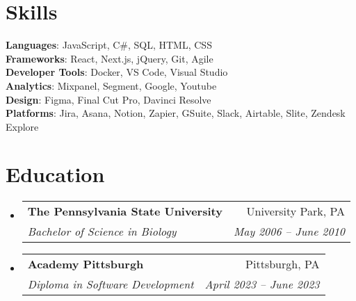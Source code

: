 \documentclass[letterpaper,11pt]{article}
\makeatletter
\newcommand{\resumeSubheading}[4]{
  \vspace{-2pt}\item
    \begin{tabular*}{0.97\textwidth}[t]{l@{\extracolsep{\fill}}r}
      \textbf{#1} & #2 \\
      \textit{\small#3} & \textit{\small #4} \\
    \end{tabular*}\vspace{-7pt}
}
\newcommand{\resumeSubHeadingListStart}{\begin{itemize}[leftmargin=0.15in, label={}]}
\newcommand{\resumeSubHeadingListEnd}{\end{itemize}}
\makeatother
\begin{document}
\section{Skills}
\begin{itemize}[leftmargin=0.15in, label={}]
    \small{
      \item{
      \textbf{Languages}{: JavaScript, C\#, SQL, HTML, CSS} \\
      \textbf{Frameworks}{: React, Next.js, jQuery, Git, Agile} \\
      \textbf{Developer Tools}{: Docker, VS Code, Visual Studio} \\
      \textbf{Analytics}{: Mixpanel, Segment, Google, Youtube} \\
      \textbf{Design}{: Figma, Final Cut Pro, Davinci Resolve} \\
      \textbf{Platforms}{: Jira, Asana, Notion, Zapier, GSuite, Slack, Airtable, Slite, Zendesk Explore} \\
      }
    }
  \end{itemize}
  
  \section{Education}
    \resumeSubHeadingListStart
      \resumeSubheading
        {The Pennsylvania State University}{University Park, PA}
        {Bachelor of Science in Biology}{May 2006 -- June 2010}
      \resumeSubheading
        {Academy Pittsburgh}{Pittsburgh, PA}
        {Diploma in Software Development}{April 2023 -- June 2023}
    \resumeSubHeadingListEnd

  
\end{document}
